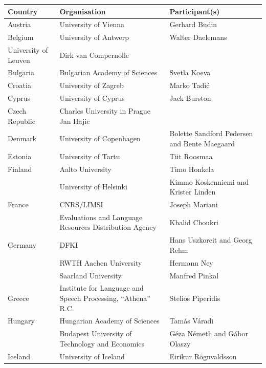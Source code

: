 \documentclass[]{../metanetpaper}
\begin{document}
\begin{tabular}{|p{1.5cm}|p{3cm}|p{5cm}|}
\hline Country & Organisation & Participant(s) \\ 
\hline Austria & University of Vienna & Gerhard Budin\\
\hline Belgium & University of Antwerp & Walter Daelemans\\
\hline University of Leuven & Dirk van Compernolle & \\
\hline Bulgaria & Bulgarian Academy of Sciences & Svetla Koeva \\
\hline Croatia & University of Zagreb & Marko Tadić\\
\hline Cyprus & University of Cyprus & Jack Burston\\
\hline Czech Republic & Charles University in Prague Jan Hajic\\
\hline Denmark & University of Copenhagen & Bolette Sandford Pedersen and
Bente Maegaard\\
\hline Estonia & University of Tartu & Tiit Roosmaa\\
\hline Finland & Aalto University & Timo Honkela\\
\hline  & University of Helsinki & Kimmo Koskenniemi and
Krister Linden \\
\hline France & CNRS/LIMSI & Joseph Mariani \\
\hline & Evaluations and Language Resources Distribution Agency & Khalid Choukri\\
\hline Germany & DFKI & Hans Uszkoreit and Georg Rehm\\
\hline & RWTH Aachen University & Hermann Ney\\
\hline & Saarland University & Manfred Pinkal\\
\hline Greece & Institute for Language and Speech Processing, “Athena” R.C. & Stelios Piperidis\\
\hline Hungary & Hungarian Academy of Sciences & Tamás Váradi\\
\hline & Budapest University of Technology and Economics & Géza Németh and Gábor Olaszy\\
\hline Iceland & University of Iceland & Eirikur Rögnvaldsson\\
\end{tabular}
	
\end{document}
